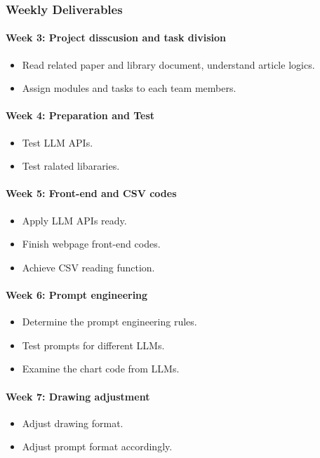 \documentclass[conference]{IEEEtran}
\begin{document}
\subsubsection{Weekly Deliverables}
\paragraph{Week 3: Project disscusion and task division}
\begin{itemize}
	\item Read related paper and library document, understand article logics.
	\item Assign modules and tasks to each team members.
\end{itemize}

\paragraph{Week 4: Preparation and Test}
\begin{itemize}
	\item Test LLM APIs.
	\item Test ralated libararies.
\end{itemize}

\paragraph{Week 5: Front-end and CSV codes}
\begin{itemize}
    \item Apply LLM APIs ready.
	\item Finish webpage front-end codes.
	\item Achieve CSV reading function.
\end{itemize}

\paragraph{Week 6: Prompt engineering}
\begin{itemize}
	\item Determine the prompt engineering rules.
	\item Test prompts for different LLMs.
	\item Examine the chart code from LLMs.
\end{itemize}

\paragraph{Week 7: Drawing adjustment}
\begin{itemize}
    \item Adjust drawing format.
	\item Adjust prompt format accordingly.
\end{itemize}
\end{document}
